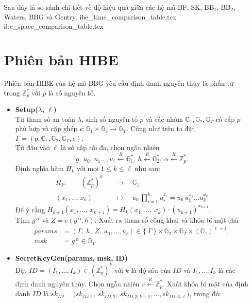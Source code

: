 \documentclass[class=report, crop=false]{standalone}
\begin{document}
		Sau đây là so sánh chi tiết về độ hiệu quả giữa các hệ mã BF, SK, BB$_1$, BB$_2$, Waters, BBG và Gentry.
		{ibe_time_comparison_table.tex}
		\newpage
		{ibe_space_comparison_table.tex}
	\newpage
	\section{Phiên bản HIBE}
		Phiên bản HIBE của hệ mã BBG yêu cầu định danh nguyên thủy là phần tử trong $\mathbb{Z}_p^*$ với $p$ là số nguyên tố.
		\vspace{-0.5\baselineskip}
		\begin{itemize}[leftmargin=1cm, itemindent=-1cm]
			\item[] {\sffamily\bfseries Setup($\lambda$, $\ell$)} \\
			Từ tham số an toàn $\lambda$, sinh số nguyên tố $p$ và các nhóm $\mathbb{G}_1, \mathbb{G}_2, \mathbb{G}_T$ có cấp $p$ phù hợp và cặp ghép $e: \mathbb{G}_1 \times \mathbb{G}_2 \rightarrow \mathbb{G}_T$. Cũng như trên ta đặt $\Gamma = (p, \mathbb{G}_1, \mathbb{G}_2, \mathbb{G}_T, e)$. \\
			Từ đầu vào $\ell$ là số cấp tối đa, chọn ngẫu nhiên
			\[
				g,\, u_0,\, u_1 \dots, u_\ell \xleftarrow{R} \mathbb{G}_1^*,\ h \xleftarrow{R} \mathbb{G}_2^*,\ \alpha \xleftarrow{R} \mathbb{Z}_p^*.
			\]
			Định nghĩa hàm $H_k$ với mọi $1 \leq k \leq \ell$ như sau:
			\begin{align*}
				H_k:\quad\quad 	(\mathbb{Z}_p^*)^k 	\quad	 &\rightarrow 	\quad  	\mathbb{G}_1 \\
								(x_1, \dots, x_k) 	\quad	 &\mapsto 		\quad  	u_0 \, \prod_{i = 1}^k u_i^{x_i} = u_0 \, u_1^{x_1}\dots u_k^{x_k}
			\end{align*}
			Để ý rằng $H_{k + 1}(x_1, \dots,\ x_{k + 1}) = H_k(x_1, \dots,\ x_k) \cdot (u_{k + 1})^{x_{k + 1}}$. \\
			Tính $g\,^\alpha$ và $Z = e(g\,^\alpha, h)$. Xuất ra tham số công khai và khóa bí mật chủ
			\begin{align*}
				params &= (\Gamma,\ h,\ Z,\ u_0, \dots, u_\ell) \in \{\ \Gamma \ \} \times \mathbb{G}_2 \times \mathbb{G}_T \times (\mathbb{G}_1)^{\ell + 1}, \\
				msk &= g\,^\alpha \in \mathbb{G}_1.
			\end{align*}
			\item[] {\sffamily\bfseries SecretKeyGen(params, msk, ID)} \\
			Đặt $ID = (I_1, \dots, I_k) \in (\mathbb{Z}_p^*)^k$ với $k$ là độ sâu của $ID$ và $I_1, \dots, I_k$ là các định danh nguyên thủy. Chọn ngẫu nhiên $r \xleftarrow{R} \mathbb{Z}_p^*$. Xuất khóa bí mật của định danh $ID$ là $sk_{ID} = \Big(sk_{ID, 1},\ sk_{ID, 2},\ sk_{ID, 3, k + 1}, \dots, sk_{ID, 3, \ell} \Big)$, trong đó:

\end{itemize}
\end{document}
